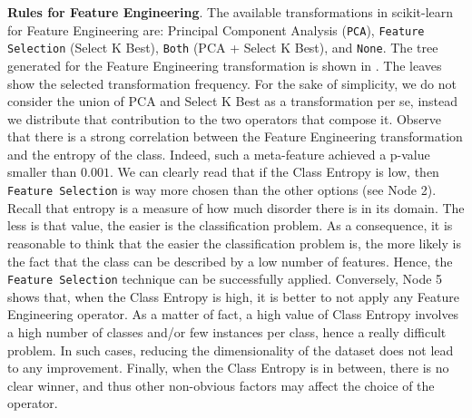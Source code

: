 \textbf{Rules for Feature Engineering}. The available transformations in scikit-learn for Feature Engineering are: Principal Component Analysis (\texttt{PCA}), \texttt{Feature Selection} (Select K Best), \texttt{Both} (PCA + Select K Best), and \texttt{None}.
The tree generated for the Feature Engineering transformation is shown in .
The leaves show the selected transformation frequency.
For the sake of simplicity, we do not consider the union of PCA and Select K Best as a transformation per se, instead we distribute that contribution to the two operators that compose it.
Observe that there is a strong correlation between the Feature Engineering transformation and the entropy of the class.
Indeed, such a meta-feature achieved a p-value smaller than $0.001$.
We can clearly read that if the Class Entropy is low, then \texttt{Feature Selection} is way more chosen than the other options (see Node 2).
Recall that entropy is a measure of how much disorder there is in its domain.
The less is that value, the easier is the classification problem.
As a consequence, it is reasonable to think that the easier the classification problem is, the more likely is the fact that the class can be described by a low number of features.
Hence, the \texttt{Feature Selection} technique can be successfully applied.
Conversely, Node 5 shows that, when the Class Entropy is high, it is better to not apply any Feature Engineering operator.
As a matter of fact, a high value of Class Entropy involves a high number of classes and/or few instances per class, hence a really difficult problem.
In such cases, reducing the dimensionality of the dataset does not lead to any improvement.
Finally, when the Class Entropy is in between, there is no clear winner, and thus other non-obvious factors may affect the choice of the operator.

